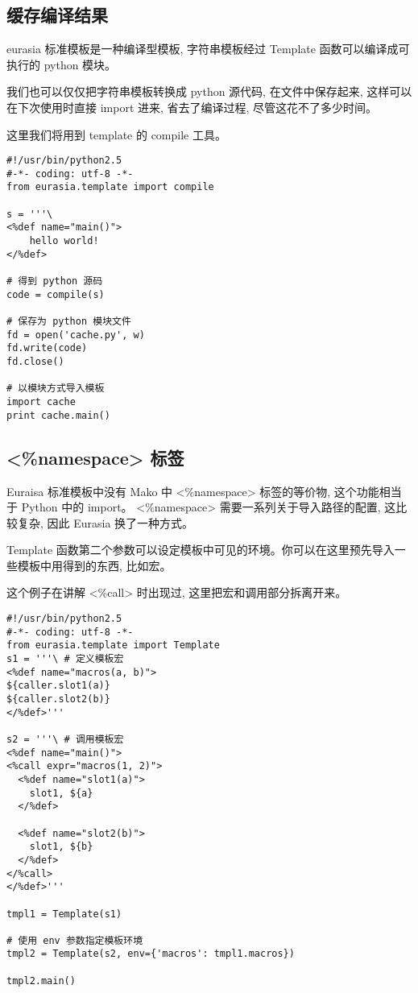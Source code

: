 \documentclass{manual}
\begin{document}


\subsection{缓存编译结果}

eurasia 标准模板是一种编译型模板, 字符串模板经过 Template 函数可以编译成可执行的 python 模块。

我们也可以仅仅把字符串模板转换成 python 源代码, 在文件中保存起来,
这样可以在下次使用时直接 import 进来, 省去了编译过程, 尽管这花不了多少时间。

这里我们将用到 template 的 compile 工具。

\begin{verbatim}
#!/usr/bin/python2.5
#-*- coding: utf-8 -*-
from eurasia.template import compile

s = '''\
<%def name="main()">
	hello world!
</%def>

# 得到 python 源码
code = compile(s)

# 保存为 python 模块文件
fd = open('cache.py', w)
fd.write(code)
fd.close()

# 以模块方式导入模板
import cache
print cache.main()
\end{verbatim}

\subsection{<\%namespace> 标签}

Euraisa 标准模板中没有 Mako 中 <\%namespace> 标签的等价物, 这个功能相当于 Python 中的 import。
<\%namespace> 需要一系列关于导入路径的配置, 这比较复杂, 因此 Eurasia 换了一种方式。

Template 函数第二个参数可以设定模板中可见的环境。你可以在这里预先导入一些模板中用得到的东西, 比如宏。

这个例子在讲解 <\%call> 时出现过, 这里把宏和调用部分拆离开来。

\begin{verbatim}
#!/usr/bin/python2.5
#-*- coding: utf-8 -*-
from eurasia.template import Template
s1 = '''\ # 定义模板宏
<%def name="macros(a, b)">
${caller.slot1(a)}
${caller.slot2(b)}
</%def>'''

s2 = '''\ # 调用模板宏
<%def name="main()">
<%call expr="macros(1, 2)">
  <%def name="slot1(a)">
    slot1, ${a}
  </%def>

  <%def name="slot2(b)">
    slot1, ${b}
  </%def>
</%call>
</%def>'''

tmpl1 = Template(s1)

# 使用 env 参数指定模板环境
tmpl2 = Template(s2, env={'macros': tmpl1.macros})

tmpl2.main()
\end{verbatim}
\end{document}
